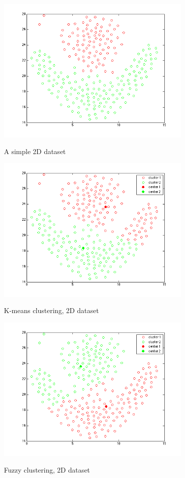 \documentclass{article}
\begin{document}
\begin{figure}[h!]
  \caption{A simple 2D dataset}
  \centering
    \includegraphics[width=0.85\textwidth]{fez_2d_base.png}
  \label{fig:fez_2d_base}
\end{figure}

\begin{figure}[h!]
  \caption{K-means clustering, 2D dataset}
  \centering
    \includegraphics[width=0.85\textwidth]{fez_2d_kmeans.png}
  \label{fig:fez_2d_kmeans}
\end{figure}

\begin{figure}[h!]
  \caption{Fuzzy clustering, 2D dataset}
  \centering
    \includegraphics[width=0.85\textwidth]{fez_2d_fuzzy.png}
  \label{fig:fez_2d_fuzzy}
\end{figure}
\end{document}
